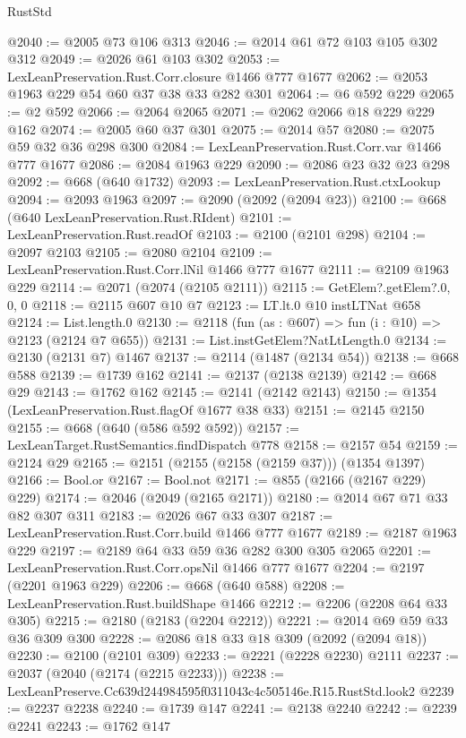 \begin{lexlean}{RustStd}
\begin{coremodule}
@2040 := @2005 @73 @106 @313
@2046 := @2014 @61 @72 @103 @105 @302 @312
@2049 := @2026 @61 @103 @302
@2053 := LexLeanPreservation.Rust.Corr.closure @1466 @777 @1677
@2062 := @2053 @1963 @229 @54 @60 @37 @38 @33 @282 @301
@2064 := @6 @592 @229
@2065 := @2 @592
@2066 := @2064 @2065
@2071 := @2062 @2066 @18 @229 @229 @162
@2074 := @2005 @60 @37 @301
@2075 := @2014 @57
@2080 := @2075 @59 @32 @36 @298 @300
@2084 := LexLeanPreservation.Rust.Corr.var @1466 @777 @1677
@2086 := @2084 @1963 @229
@2090 := @2086 @23 @32 @23 @298
@2092 := @668 (@640 @1732)
@2093 := LexLeanPreservation.Rust.ctxLookup
@2094 := @2093 @1963
@2097 := @2090 (@2092 (@2094 @23))
@2100 := @668 (@640 LexLeanPreservation.Rust.RIdent)
@2101 := LexLeanPreservation.Rust.readOf
@2103 := @2100 (@2101 @298)
@2104 := @2097 @2103
@2105 := @2080 @2104
@2109 := LexLeanPreservation.Rust.Corr.lNil @1466 @777 @1677
@2111 := @2109 @1963 @229
@2114 := @2071 (@2074 (@2105 @2111))
@2115 := GetElem?.getElem?.{0, 0, 0}
@2118 := @2115 @607 @10 @7
@2123 := LT.lt.{0} @10 instLTNat @658
@2124 := List.length.{0}
@2130 := @2118 (fun (as : @607) => fun (i : @10) => @2123 (@2124 @7 @655))
@2131 := List.instGetElem?NatLtLength.{0}
@2134 := @2130 (@2131 @7) @1467
@2137 := @2114 (@1487 (@2134 @54))
@2138 := @668 @588
@2139 := @1739 @162
@2141 := @2137 (@2138 @2139)
@2142 := @668 @29
@2143 := @1762 @162
@2145 := @2141 (@2142 @2143)
@2150 := @1354 (LexLeanPreservation.Rust.flagOf @1677 @38 @33)
@2151 := @2145 @2150
@2155 := @668 (@640 (@586 @592 @592))
@2157 := LexLeanTarget.RustSemantics.findDispatch @778
@2158 := @2157 @54
@2159 := @2124 @29
@2165 := @2151 (@2155 (@2158 (@2159 @37))) (@1354 @1397)
@2166 := Bool.or
@2167 := Bool.not
@2171 := @855 (@2166 (@2167 @229) @229)
@2174 := @2046 (@2049 (@2165 @2171))
@2180 := @2014 @67 @71 @33 @82 @307 @311
@2183 := @2026 @67 @33 @307
@2187 := LexLeanPreservation.Rust.Corr.build @1466 @777 @1677
@2189 := @2187 @1963 @229
@2197 := @2189 @64 @33 @59 @36 @282 @300 @305 @2065
@2201 := LexLeanPreservation.Rust.Corr.opsNil @1466 @777 @1677
@2204 := @2197 (@2201 @1963 @229)
@2206 := @668 (@640 @588)
@2208 := LexLeanPreservation.Rust.buildShape @1466
@2212 := @2206 (@2208 @64 @33 @305)
@2215 := @2180 (@2183 (@2204 @2212))
@2221 := @2014 @69 @59 @33 @36 @309 @300
@2228 := @2086 @18 @33 @18 @309 (@2092 (@2094 @18))
@2230 := @2100 (@2101 @309)
@2233 := @2221 (@2228 @2230) @2111
@2237 := @2037 (@2040 (@2174 (@2215 @2233)))
@2238 := LexLeanPreserve.Cc639d244984595f0311043c4c505146e.R15.RustStd.look2
@2239 := @2237 @2238
@2240 := @1739 @147
@2241 := @2138 @2240
@2242 := @2239 @2241
@2243 := @1762 @147

\end{coremodule}
\end{lexlean}
